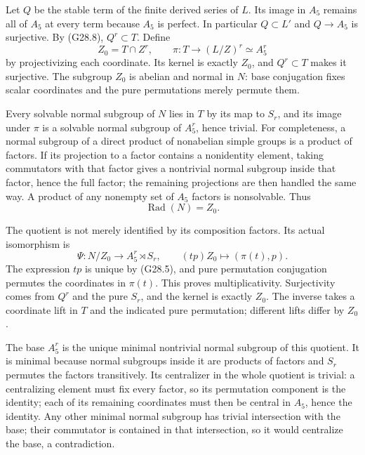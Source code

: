 Let \(Q\) be the stable term of the finite derived series
of \(L\). Its image in \(A_5\) remains all of \(A_5\)
at every term because \(A_5\) is perfect. In particular
\(Q\subset L'\) and \(Q\to A_5\) is surjective.
By (G28.8), \(Q^r\subset T\). Define
\[
          Z_0=T\cap Z^r,\qquad
          \pi:T\longrightarrow (L/Z)^r\simeq A_5^r
                                                               \tag{G28.12}
\]
by projectivizing each coordinate. Its kernel is exactly
\(Z_0\), and \(Q^r\subset T\) makes it surjective.
The subgroup \(Z_0\) is abelian and normal in \(N\):
base conjugation fixes scalar coordinates and the pure
permutations merely permute them.

Every solvable normal subgroup of \(N\) lies in \(T\)
by its map to \(S_r\), and its image under \(\pi\) is
a solvable normal subgroup of \(A_5^r\), hence trivial.
For completeness, a normal subgroup of a direct product of
nonabelian simple groups is a product of factors. If its
projection to a factor contains a nonidentity element, taking
commutators with that factor gives a nontrivial normal subgroup
inside that factor, hence the full factor; the remaining
projections are then handled the same way. A product of any
nonempty set of \(A_5\) factors is nonsolvable. Thus
\[
                    \operatorname{Rad}(N)=Z_0.              \tag{G28.13}
\]

The quotient is not merely identified by its composition
factors. Its actual isomorphism is
\[
 \Psi:N/Z_0\longrightarrow A_5^r\rtimes S_r,
 \qquad (t p)Z_0\longmapsto(\pi(t),p).                     \tag{G28.14}
\]
The expression \(tp\) is unique by (G28.5), and pure
permutation conjugation permutes the coordinates in
\(\pi(t)\). This proves multiplicativity. Surjectivity
comes from \(Q^r\) and the pure \(S_r\), and the kernel
is exactly \(Z_0\). The inverse takes a coordinate lift
in \(T\) and the indicated pure permutation; different
lifts differ by \(Z_0\).

The base \(A_5^r\) is the unique minimal nontrivial normal
subgroup of this quotient. It is minimal because normal
subgroups inside it are products of factors and \(S_r\)
permutes the factors transitively. Its centralizer in the
whole quotient is trivial: a centralizing element must fix
every factor, so its permutation component is the identity;
each of its remaining coordinates must then be central in
\(A_5\), hence the identity. Any other minimal normal
subgroup has trivial intersection with the base; their
commutator is contained in that intersection, so it would
centralize the base, a contradiction.


